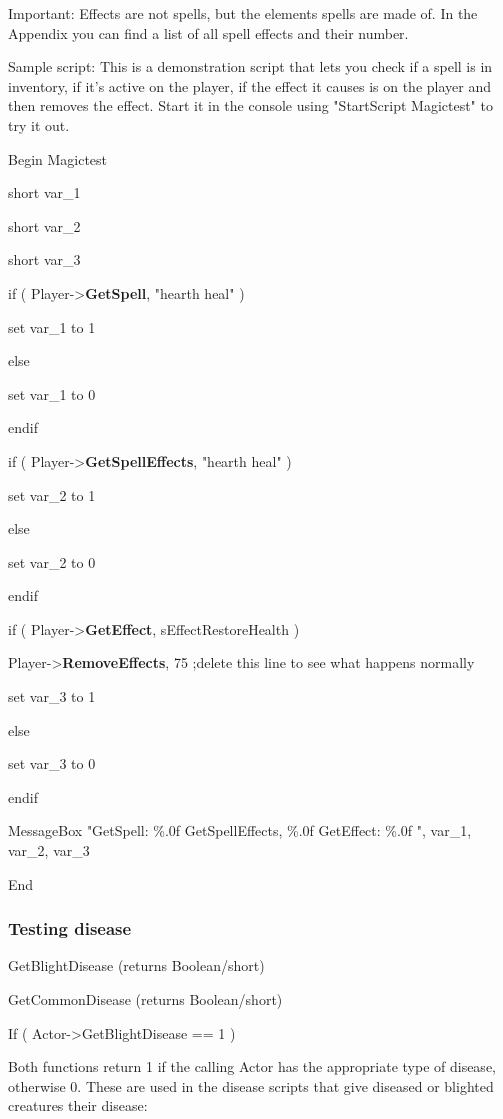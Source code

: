 \documentclass[
]{article}
\begin{document}
Important: Effects are not spells, but the elements spells are made of.
In the Appendix you can find a list of all spell effects and their
number.

Sample script: This is a demonstration script that lets you check if a
spell is in inventory, if it's active on the player, if the effect it
causes is on the player and then removes the effect. Start it in the
console using "StartScript Magictest" to try it out.

Begin Magictest

short var\_1

short var\_2

short var\_3

if ( Player-\textgreater{}\textbf{GetSpell}, "hearth heal" )

set var\_1 to 1

else

set var\_1 to 0

endif

if ( Player-\textgreater{}\textbf{GetSpellEffects}, "hearth heal" )

set var\_2 to 1

else

set var\_2 to 0

endif

if ( Player-\textgreater{}\textbf{GetEffect}, sEffectRestoreHealth )

Player-\textgreater{}\textbf{RemoveEffects}, 75 ;delete this line to see
what happens normally

set var\_3 to 1

else

set var\_3 to 0

endif

MessageBox "GetSpell: \%.0f GetSpellEffects, \%.0f GetEffect: \%.0f ",
var\_1, var\_2, var\_3

End

\hypertarget{testing-disease}{%
\subsubsection{Testing disease}\label{testing-disease}}

GetBlightDisease (returns Boolean/short)

GetCommonDisease (returns Boolean/short)

If ( Actor-\textgreater GetBlightDisease == 1 )

Both functions return 1 if the calling Actor has the appropriate type of
disease, otherwise 0. These are used in the disease scripts that give
diseased or blighted creatures their disease:
\end{document}
